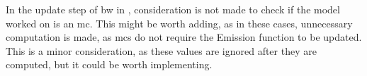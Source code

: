 In the update step of \gls{bw} in \Cupaal, consideration is not made to check if the model worked on is an \gls{mc}.
This might be worth adding, as in these cases, unnecessary computation is made, as \glspl{mc} do not require the Emission function to be updated.
This is a minor consideration, as these values are ignored after they are computed, but it could be worth implementing.









